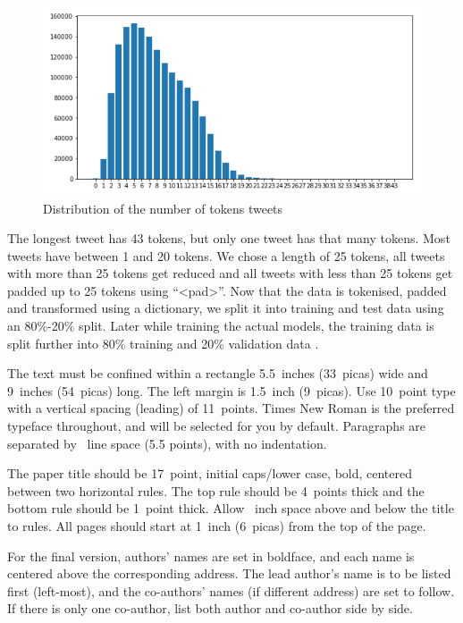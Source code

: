 \documentclass{article}
\begin{document}
\begin{figure}[H]
  \centering
  \includegraphics[scale=0.65]{Frequency.PNG}
  \caption{Distribution of the number of tokens tweets}
\end{figure}

The longest tweet has 43 tokens, but only one tweet has that many tokens. Most
tweets have between 1 and 20 tokens. We chose a length of 25 tokens, all tweets
with more than 25 tokens get reduced and all tweets with less than 25 tokens get
padded up to 25 tokens using “<pad>”. Now that the data is tokenised, padded and
transformed using a dictionary, we split it into training and test data using an
80\%-20\% split. Later while training the actual models, the training data is
split further into 80\% training and 20\% validation data .
\label{gen_inst}

The text must be confined within a rectangle 5.5~inches (33~picas) wide and
9~inches (54~picas) long. The left margin is 1.5~inch (9~picas).  Use 10~point
type with a vertical spacing (leading) of 11~points.  Times New Roman is the
preferred typeface throughout, and will be selected for you by default.
Paragraphs are separated by ~line space (5.5 points), with no
indentation.

The paper title should be 17~point, initial caps/lower case, bold, centered
between two horizontal rules. The top rule should be 4~points thick and the
bottom rule should be 1~point thick. Allow ~inch space above and
below the title to rules. All pages should start at 1~inch (6~picas) from the
top of the page.

For the final version, authors' names are set in boldface, and each name is
centered above the corresponding address. The lead author's name is to be listed
first (left-most), and the co-authors' names (if different address) are set to
follow. If there is only one co-author, list both author and co-author side by
side.
\end{document}
